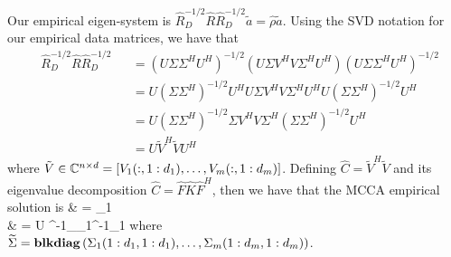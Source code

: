 Our empirical eigen-system is
$\widehat{R}_D^{-1/2}\widehat{R}\widehat{R}_D^{-1/2}\widetilde{a} =
\widehat{\rho}\widetilde{a}$. Using the SVD notation for our empirical data matrices, we
have that
\begin{equation*}
\begin{aligned}
&\widehat{R}_D^{-1/2}\widehat{R}\widehat{R}_D^{-1/2}&&=\left(U\Sigma\Sigma^HU^H\right)^{-1/2}\left(U\Sigma V^HV\Sigma^H U^H\right)\left(U\Sigma\Sigma^HU^H\right)^{-1/2}\\
&&&=U(\Sigma\Sigma^H)^{-1/2}U^HU\Sigma V^HV\Sigma^HU^HU(\Sigma\Sigma^H)^{-1/2}U^H\\
&&& = U(\Sigma\Sigma^H)^{-1/2}\Sigma V^HV\Sigma^H(\Sigma\Sigma^H)^{-1/2}U^H\\
&&&=U\widetilde{V}^H\widetilde{V}U^H
\end{aligned}
\end{equation*}
where $\tilde{V}\in\mathbb{C}^{n\times d}=[V_1(:,1:d_1),\dots,V_m(:,1:d_m)]$. Defining $\widehat{C} = \widetilde{V}^H\widetilde{V}$ and its eigenvalue decomposition $\widehat{C} = \widehat{F}\widehat{K}\widehat{F}^H$, then we have that the MCCA empirical solution is
\be\ba
& \widehat{\rho} = _1\\
&  = U \widetilde{\Sigma}^{-1}\Lambda_{_1}^{-1}_1
\ea\ee
where $\widetilde{\Sigma} = \mathop{\bf blkdiag}\left(\Sigma_1(1:d_1,1:d_1),\dots, \Sigma_m(1:d_m,1:d_m)\right)$.

